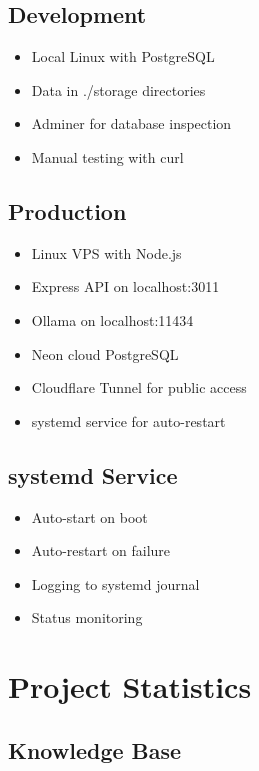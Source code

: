 \documentclass[12pt]{article}
\begin{document}
\subsection{Development}

\begin{itemize}
    \item Local Linux with PostgreSQL
    \item Data in ./storage directories
    \item Adminer for database inspection
    \item Manual testing with curl
\end{itemize}

\subsection{Production}

\begin{itemize}
    \item Linux VPS with Node.js
    \item Express API on localhost:3011
    \item Ollama on localhost:11434
    \item Neon cloud PostgreSQL
    \item Cloudflare Tunnel for public access
    \item systemd service for auto-restart
\end{itemize}

\subsection{systemd Service}

\begin{itemize}
    \item Auto-start on boot
    \item Auto-restart on failure
    \item Logging to systemd journal
    \item Status monitoring
\end{itemize}

\section{Project Statistics}

\subsection{Knowledge Base}
\end{document}
